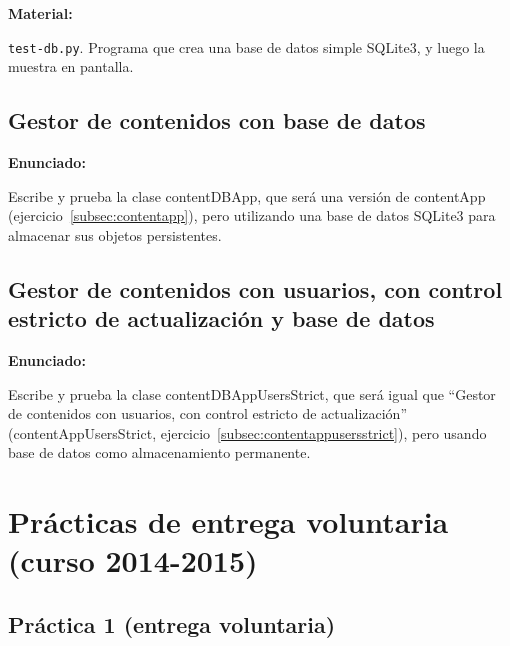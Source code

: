 \textbf{Material:}

\texttt{test-db.py}. Programa que crea una base de datos simple SQLite3, y luego la muestra en pantalla.

\subsection{Gestor de contenidos con base de datos}
\label{subsec:gestor-contenidos-bbdd}

\textbf{Enunciado:}

Escribe y prueba la clase contentDBApp, que será una versión de contentApp (ejercicio~\ref{subsec:contentapp}), pero utilizando una base de datos SQLite3 para almacenar sus objetos persistentes.

\subsection{Gestor de contenidos con usuarios, con control estricto de actualización y base de datos}
\label{subsec:gestor-contenidos-usuarios-bbdd}

\textbf{Enunciado:}

Escribe y prueba la clase contentDBAppUsersStrict, que será igual que ``Gestor de contenidos con usuarios, con control estricto de actualización'' (contentAppUsersStrict, ejercicio~\ref{subsec:contentappusersstrict}), pero usando base de datos como almacenamiento permanente.

\newpage

\section{Prácticas de entrega voluntaria (curso 2014-2015)}


\subsection{Práctica 1 (entrega voluntaria)}
\label{subsec:practica-vol-1-2013}

